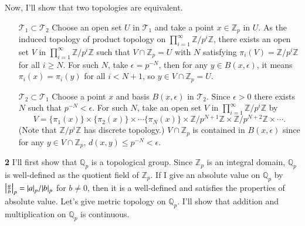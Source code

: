 \documentclass[a4paper, 12pt]{article}
\theoremstyle{Mydefinition}
\theoremstyle{Mytheorem}
\newcommand{\quotZ}[1]{\ensuremath{\mathbb{Z}/p^{#1}\mathbb{Z}}}
\begin{document}
Now, I'll show that two topologies are equivalent.  
\begin{enumerate}
    \item[$\mathcal{T}_1\subset \mathcal{T}_2$] Choose an open set $U$ in $\mathcal{T}_1$ and take a point $x\in \mathbb{Z}_p$ in $U$. As the induced topology of product topology on $\prod_{i=1}^\infty \quotZ{i}$, there exists an open set $V$ in $\prod_{i=1}^\infty \quotZ{i}$ such that $V\cap \mathbb{Z}_p = U$ with $N$ satisfying $\pi_i(V) = \quotZ{i}$ for all $i\geq N$. For such $N$, take $\epsilon = p^{-N}$, then for any $y\in B(x, \epsilon)$, it means $\pi_i(x)=\pi_i(y)$ for all $i<N+1$, so $y\in V\cap \mathbb{Z}_p = U$.
    \item[$\mathcal{T}_2\subset \mathcal{T}_1$] Choose a point $x$ and basis $B(x, \epsilon)$ in $\mathcal{T}_2$. Since $\epsilon>0$ there exists $N$ such that $p^{-N}<\epsilon$. For such $N$, take an open set $V$ in $\prod_{i=1}^\infty \quotZ{i}$ by 
    \begin{equation}
        V = \{\pi_1(x)\}\times \{\pi_2(x)\}\times \cdots \{\pi_N(x)\}\times \quotZ{N+1}\times \quotZ{N+2}\times \cdots.
    \end{equation}
    (Note that $\quotZ{i}$ has discrete topology.) $V\cap \mathbb{Z}_p$ is contained in $B(x,\epsilon)$ since for any $y\in V\cap \mathbb{Z}_p$, $d(x,y) \leq p^{-N}<\epsilon$.
\end{enumerate}


\noindent \textbf{2}
I'll first show that $\mathbb{Q}_p$ is a topological group. Since $\mathbb{Z}_p$ is an integral domain, $\mathbb{Q}_p$ is well-defined as the quotient field of $\mathbb{Z}_p$. If I give an absolute value on $\mathbb{Q}_p$ by $\abs{\frac{a}{b}}_p = \abs{a}_p/\abs{b}_p$ for $b\neq 0$, then it is a well-defined and satisfies the properties of absolute value. Let's give metric topology on $\mathbb{Q}_p$. I'll show that addition and multiplication on $\mathbb{Q}_p$ is continuous.
\end{document}
